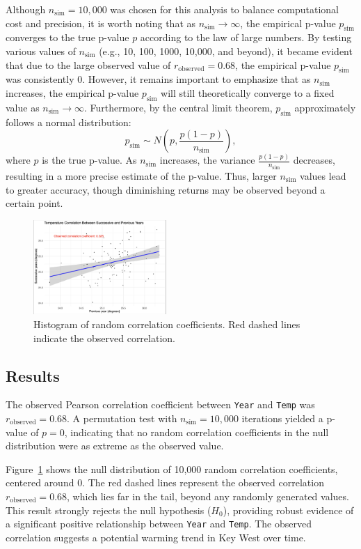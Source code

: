 \documentclass[a4paper,10pt]{article}
\begin{document}
Although $n_{\text{sim}} = 10,000$ was chosen for this analysis to balance computational cost and precision, it is worth noting that as $n_{\text{sim}} \to \infty$, the empirical p-value $p_{\text{sim}}$ converges to the true p-value $p$ according to the law of large numbers. By testing various values of $n_{\text{sim}}$ (e.g., 10, 100, 1000, 10,000, and beyond), it became evident that due to the large observed value of $r_{\text{observed}} = 0.68$, the empirical p-value $p_{\text{sim}}$ was consistently $0$. However, it remains important to emphasize that as $n_{\text{sim}}$ increases, the empirical p-value $p_{\text{sim}}$ will still theoretically converge to a fixed value as $n_{\text{sim}} \to \infty$. Furthermore, by the central limit theorem, $p_{\text{sim}}$ approximately follows a normal distribution:
\[
p_{\text{sim}} \sim N\left(p, \frac{p(1-p)}{n_{\text{sim}}}\right),
\]
where $p$ is the true p-value. As $n_{\text{sim}}$ increases, the variance $\frac{p(1-p)}{n_{\text{sim}}}$ decreases, resulting in a more precise estimate of the p-value. Thus, larger $n_{\text{sim}}$ values lead to greater accuracy, though diminishing returns may be observed beyond a certain point.


\begin{figure}[h!]
\centering
\includegraphics[width=0.45\textwidth]{../data/1.png}
\caption{Histogram of random correlation coefficients. Red dashed lines indicate the observed correlation.}
\label{fig:null_distribution}
\end{figure}

\subsection*{Results}
The observed Pearson correlation coefficient between \texttt{Year} and \texttt{Temp} was \( r_{\text{observed}} = 0.68 \). A permutation test with \( n_{\text{sim}} = 10,000 \) iterations yielded a p-value of \( p = 0 \), indicating that no random correlation coefficients in the null distribution were as extreme as the observed value.

Figure~\ref{fig:null_distribution} shows the null distribution of 10,000 random correlation coefficients, centered around 0. The red dashed lines represent the observed correlation \( r_{\text{observed}} = 0.68 \), which lies far in the tail, beyond any randomly generated values. This result strongly rejects the null hypothesis (\( H_0 \)), providing robust evidence of a significant positive relationship between \texttt{Year} and \texttt{Temp}. The observed correlation suggests a potential warming trend in Key West over time.
\end{document}
